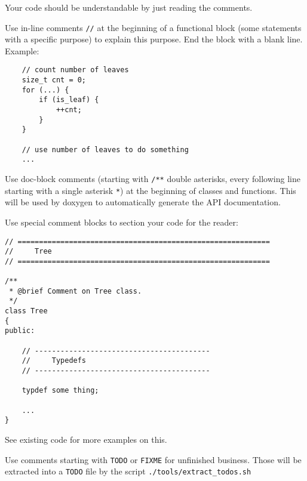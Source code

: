 \documentclass[a4paper,10pt]{article}
\begin{document}
Your code should be understandable by just reading the comments.

Use in-line comments \verb|//| at the beginning of a functional block (some statements with a specific purpose) to explain this purpose. End the block with a blank line.
Example:
\begin{verbatim}
    // count number of leaves
    size_t cnt = 0;
    for (...) {
        if (is_leaf) {
            ++cnt;
        }
    }
    
    // use number of leaves to do something
    ...
\end{verbatim}

Use doc-block comments (starting with \verb|/**| double asterisks, every following line starting with a single asterisk \verb|*|) at the beginning of classes and functions. This will be used by doxygen to automatically generate the API documentation.

Use special comment blocks to section your code for the reader:
\begin{verbatim}
// ===========================================================
//     Tree
// ===========================================================

/**
 * @brief Comment on Tree class.
 */
class Tree
{
public:

    // -----------------------------------------
    //     Typedefs
    // -----------------------------------------
    
    typdef some thing;
    
    ...
}
\end{verbatim}
See existing code for more examples on this.

Use comments starting with \verb|TODO| or \verb|FIXME| for unfinished business. Those will be extracted into a \verb|TODO| file by the script \verb|./tools/extract_todos.sh|
\end{document}
